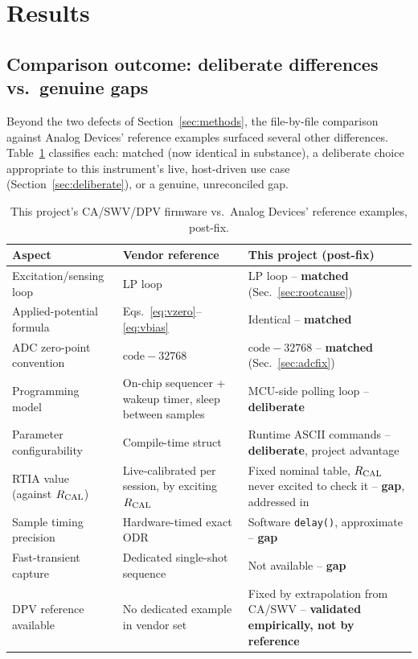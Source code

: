 \section{Results}
\label{sec:results}

\subsection{Comparison outcome: deliberate differences vs.\ genuine gaps}
\label{sec:comparison-outcome}
Beyond the two defects of Section~\ref{sec:methods}, the file-by-file
comparison against Analog Devices' reference examples surfaced several
other differences. Table~\ref{tab:summary} classifies each: matched
(now identical in substance), a deliberate choice appropriate to this
instrument's live, host-driven use case
(Section~\ref{sec:deliberate}), or a genuine, unreconciled gap.

\begin{table}[h]
\centering
\footnotesize
\setlength{\tabcolsep}{4pt}
\caption{This project's CA/SWV/DPV firmware vs.\ Analog Devices' reference
examples, post-fix.}
\label{tab:summary}
\begin{tabular}{@{}p{2.7cm}p{2.5cm}p{2.7cm}@{}}
\toprule
Aspect & Vendor reference & This project (post-fix) \\
\midrule
Excitation/sensing loop & LP loop & LP loop -- \textbf{matched} (Sec.~\ref{sec:rootcause}) \\
Applied-potential formula & Eqs.~\eqref{eq:vzero}--\eqref{eq:vbias} & Identical -- \textbf{matched} \\
ADC zero-point convention & $\mathrm{code}-32768$ & $\mathrm{code}-32768$ -- \textbf{matched} (Sec.~\ref{sec:adcfix}) \\
Programming model & On-chip sequencer + wakeup timer, sleep between samples & MCU-side polling loop -- \textbf{deliberate} \\
Parameter configurability & Compile-time struct & Runtime ASCII commands -- \textbf{deliberate}, project advantage \\
RTIA value (against $R_{\mathrm{CAL}}$) & Live-calibrated per session, by exciting $R_{\mathrm{CAL}}$ & Fixed nominal table, $R_{\mathrm{CAL}}$ never excited to check it -- \textbf{gap}, addressed in~\cite{clement2026linearity} \\
Sample timing precision & Hardware-timed exact ODR & Software \texttt{delay()}, approximate -- \textbf{gap} \\
Fast-transient capture & Dedicated single-shot sequence & Not available -- \textbf{gap} \\
DPV reference available & No dedicated example in vendor set & Fixed by extrapolation from CA/SWV -- \textbf{validated empirically, not by reference} \\
\bottomrule
\end{tabular}
\end{table}

